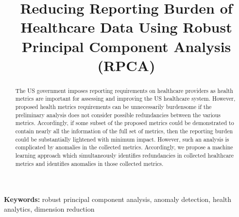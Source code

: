 \documentclass[conference]{IEEEtran}
\begin{document}
\title{ Reducing Reporting Burden of Healthcare Data Using Robust Principal Component Analysis (RPCA)}

\author{
\and
{}
}

\maketitle

\thispagestyle{plain}
\pagestyle{plain}

\begin{abstract}
The US government imposes reporting requirements on healthcare providers as health metrics are important for assessing and improving the US healthcare system.  However, proposed health metrics requirements can be unnecessarily burdensome if the preliminary analysis does not consider possible redundancies between the various metrics.  Accordingly, if some subset of the proposed metrics could be demonstrated to contain nearly all the information of  the full set of metrics,
then the reporting burden could be substantially  lightened with minimum impact.  However, such an analysis is complicated by anomalies in the collected metrics.  Accordingly, we propose a machine learning approach which simultaneously identifies redundancies in collected healthcare metrics and identifies anomalies in those collected metrics.
\end{abstract}

{\bf Keywords:} robust principal component analysis, anomaly
detection, health analytics, dimension reduction
\end{document}
